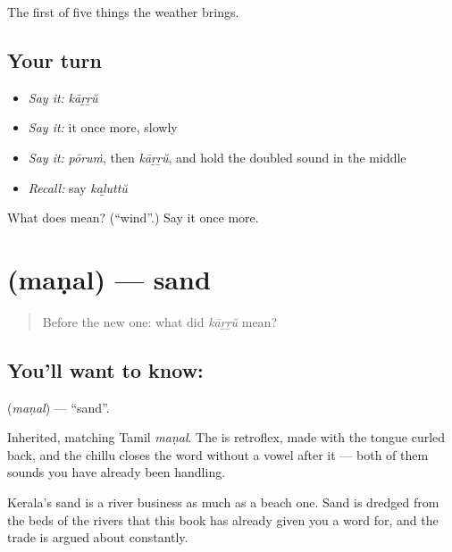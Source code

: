 \begin{grammarlens}[title={What you've built}]
The first of five things the weather brings.
\end{grammarlens}

\subsection*{Your turn}
\begin{itemize}
\raggedright
  \item \emph{Say it:} \emph{kāṟṟŭ}
  \item \emph{Say it:} it once more, slowly
  \item \emph{Say it:} \emph{pōruṁ}, then \emph{kāṟṟŭ}, and hold the doubled sound in the middle
  \item \emph{Recall:} say \emph{kaḻuttŭ}
\end{itemize}

\begin{tcolorbox}[breakable,colback=teal!4,colframe=teal!35!black,title={Before you move on}]
What does  mean? (\textquotedblleft{}wind\textquotedblright{}.) Say it once more.
\end{tcolorbox}
\section[\texorpdfstring{\ml{മണൽ} (maṇal)}{മണൽ (maṇal)}]{ (maṇal) — sand}

\label{lesson:ML-C59-sand}



\begin{quote}
Before the new one: what did \emph{kāṟṟŭ} mean?
\end{quote}

\subsection*{You'll want to know: }
\textbf{} (\emph{maṇal}) — \textquotedblleft{}sand\textquotedblright{}.

Inherited, matching Tamil \emph{maṇal}. The  is retroflex, made with the tongue curled back, and the chillu  closes the word without a vowel after it — both of them sounds you have already been handling.

Kerala's sand is a river business as much as a beach one. Sand is dredged from the beds of the rivers that this book has already given you a word for, and the trade is argued about constantly.

